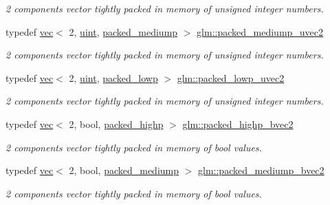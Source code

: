 \begin{DoxyCompactItemize}
\begin{DoxyCompactList}\small\item\em 2 components vector tightly packed in memory of unsigned integer numbers. \end{DoxyCompactList}\item 
typedef \mbox{\hyperlink{structglm_1_1vec}{vec}}$<$ 2, \mbox{\hyperlink{group__core__precision_ga4fd29415871152bfb5abd588334147c8}{uint}}, \mbox{\hyperlink{namespaceglm_a36ed105b07c7746804d7fdc7cc90ff25a9604654c3b137cd7898689fd34b25bc0}{packed\+\_\+mediump}} $>$ \mbox{\hyperlink{group__gtc__type__aligned_ga18dd6e7cd05a4239428b2a0751d48d4a}{glm\+::packed\+\_\+mediump\+\_\+uvec2}}
\begin{DoxyCompactList}\small\item\em 2 components vector tightly packed in memory of unsigned integer numbers. \end{DoxyCompactList}\item 
typedef \mbox{\hyperlink{structglm_1_1vec}{vec}}$<$ 2, \mbox{\hyperlink{group__core__precision_ga4fd29415871152bfb5abd588334147c8}{uint}}, \mbox{\hyperlink{namespaceglm_a36ed105b07c7746804d7fdc7cc90ff25ac36a4bd74559be2c0b65bc48e5953b8b}{packed\+\_\+lowp}} $>$ \mbox{\hyperlink{group__gtc__type__aligned_ga48ab6ca01a9d2418365ca7c3ea1183e8}{glm\+::packed\+\_\+lowp\+\_\+uvec2}}
\begin{DoxyCompactList}\small\item\em 2 components vector tightly packed in memory of unsigned integer numbers. \end{DoxyCompactList}\item 
typedef \mbox{\hyperlink{structglm_1_1vec}{vec}}$<$ 2, bool, \mbox{\hyperlink{namespaceglm_a36ed105b07c7746804d7fdc7cc90ff25a8e8791ee77fe079b1291f710d88031bf}{packed\+\_\+highp}} $>$ \mbox{\hyperlink{group__gtc__type__aligned_ga8059c50785881a9f30b9a8e3ff5daf83}{glm\+::packed\+\_\+highp\+\_\+bvec2}}
\begin{DoxyCompactList}\small\item\em 2 components vector tightly packed in memory of bool values. \end{DoxyCompactList}\item 
typedef \mbox{\hyperlink{structglm_1_1vec}{vec}}$<$ 2, bool, \mbox{\hyperlink{namespaceglm_a36ed105b07c7746804d7fdc7cc90ff25a9604654c3b137cd7898689fd34b25bc0}{packed\+\_\+mediump}} $>$ \mbox{\hyperlink{group__gtc__type__aligned_ga5c9715603d1138006760556f02aacad5}{glm\+::packed\+\_\+mediump\+\_\+bvec2}}
\begin{DoxyCompactList}\small\item\em 2 components vector tightly packed in memory of bool values. \end{DoxyCompactList}\item 

\end{DoxyCompactItemize}
